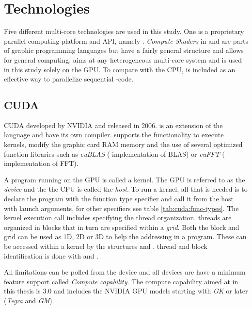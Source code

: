\chapter{Technologies}\label{cha:technologies}

\newcommand{\procwidth}{{\textwidth * 3 / 4}}

Five different multi-core technologies are used in this study. One is a proprietary parallel computing platform and \gls{API}, namely {\CU}. \textit{Compute Shaders} in {\GL} and {\DX} are parts of graphic programming languages but have a fairly general structure and allows for general computing. {\OCL} aims at any heterogeneous multi-core system and is used in this study solely on the \gls{GPU}. To compare with the \gls{CPU}, {\OMP} is included as an effective way to parallelize sequential {\CPP}-code.

\section{CUDA}

\gls{CUDA} developed by NVIDIA and released in 2006. {\CU} is an extension of the {\CPP} language and have its own compiler. {\CU} supports the functionality to execute kernels, modify the graphic card RAM memory and the use of several optimized function libraries such as \textit{cuBLAS} ({\CU} implementation of \gls{BLAS}) or \textit{cuFFT} ({\CU} implementation of \gls{FFT}).

A program running on the \gls{GPU} is called a \gls{kernel}. The \gls{GPU} is referred to as the \textit{device} and the the \gls{CPU} is called the \textit{host}. To run a {\CU} \gls{kernel}, all that is needed is to declare the program with the function type specifier  and call it from the host with launch arguments, for other specifiers see table \ref{tab:cuda:func-types}. The \gls{kernel} execution call includes specifying the \gls{thread} organization. \Glspl{thread} are organized in \glspl{block} that in turn are specified within a \emph{grid}. Both the \gls{block} and grid can be used as \gls{1D}, \gls{2D} or \gls{3D} to help the addressing in a program. These can be accessed within a \gls{kernel} by the structures  and . \Gls{thread} and \gls{block} identification is done with  and .

All limitations can be polled from the device and all devices are have a minimum feature support called \emph{Compute capability}. The compute capability aimed at in this thesis is $3.0$ and includes the NVIDIA \gls{GPU} models starting with \emph{GK} or later (\emph{Tegra} and \emph{GM}).

